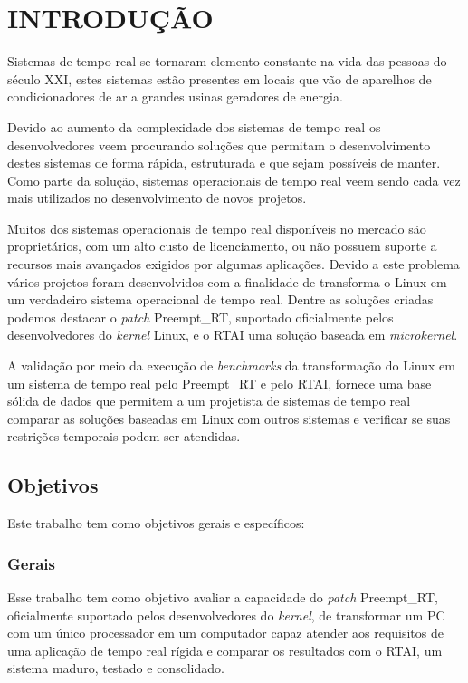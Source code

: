 \chapter{INTRODUÇÃO}
\label{cap:introducao}
Sistemas de tempo real se tornaram elemento constante na vida das pessoas do século XXI, estes sistemas estão presentes em locais que vão de aparelhos de condicionadores de ar a grandes usinas geradores de energia.

Devido ao aumento da complexidade dos sistemas de tempo real os desenvolvedores veem procurando soluções que permitam o desenvolvimento destes sistemas de forma rápida, estruturada e que sejam possíveis de manter. Como parte da solução, sistemas operacionais de tempo real veem sendo cada vez mais utilizados no desenvolvimento de novos projetos. 

Muitos dos sistemas operacionais de tempo real disponíveis no mercado são proprietários, com um alto custo de licenciamento, ou não possuem suporte a recursos mais avançados exigidos por algumas aplicações. Devido a este problema vários projetos foram desenvolvidos com a finalidade de transforma o Linux em um verdadeiro sistema operacional de tempo real. Dentre as soluções criadas podemos destacar o \textit{patch} Preempt\_RT, suportado oficialmente pelos desenvolvedores do \textit{kernel} Linux, e o RTAI uma solução baseada em \textit{microkernel}.

A validação por meio da execução de \textit{benchmarks} da transformação do Linux em um sistema de tempo real pelo Preempt\_RT e pelo RTAI, fornece uma base sólida de dados que permitem a um projetista de sistemas de tempo real comparar as soluções baseadas em Linux com outros sistemas e verificar se suas restrições temporais podem ser atendidas.

\section{Objetivos}
Este trabalho tem como objetivos gerais e específicos:
\subsection{Gerais}
Esse trabalho tem como objetivo avaliar a capacidade do \textit{patch} Preempt\_RT, oficialmente
suportado pelos desenvolvedores do \textit{kernel}, de transformar um PC com um único processador em um
computador capaz atender aos requisitos de uma aplicação de tempo real rígida e comparar os
resultados com o RTAI, um sistema maduro, testado e consolidado.

